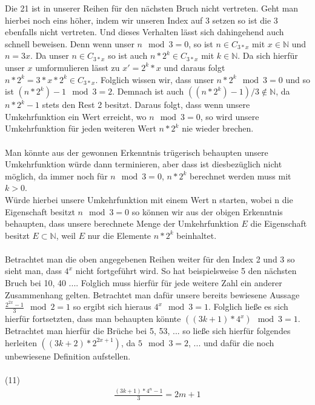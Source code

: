 \documentclass{article}
\begin{document}
Die 21 ist in unserer Reihen für den nächsten Bruch nicht vertreten. Geht man hierbei noch eins höher, indem wir unseren Index auf 3 setzen so ist die 3 ebenfalls nicht vertreten. Und dieses Verhalten lässt sich dahingehend auch schnell beweisen. Denn wenn unser $n \mod 3 = 0$, so ist $n \in C_{3 * x}$ mit $x \in \mathbb{N}$ und $n = 3x$. Da unser $n \in C_{3 * x}$ so ist auch $n * 2^k \in C_{3 * x}$ mit $k \in \mathbb{N}$. Da sich hierfür unser $x$ umformulieren lässt zu $x' = 2^k * x$ und daraus folgt $n * 2^k  = 3 * x * 2^k \in C_{3 * x}$. Folglich wissen wir, dass unser $n * 2^k \mod 3 = 0$ und so ist $(n * 2^k) - 1 \mod 3 = 2$. Demnach ist auch $((n * 2^k) - 1) / 3 \notin \mathbb{N}$, da $n * 2^k - 1$ stets den Rest 2 besitzt. Daraus folgt, dass wenn unsere Umkehrfunktion ein Wert erreicht, wo $n \mod 3 = 0$, so wird unsere Umkehrfunktion für jeden weiteren Wert $n * 2^k$ nie wieder brechen.\\\\
Man könnte aus der gewonnen Erkenntnis trügerisch behaupten unsere Umkehrfunktion würde dann terminieren, aber dass ist diesbezüglich nicht möglich, da immer noch für $n \mod 3 = 0$, $n * 2^k$ berechnet werden muss mit $k > 0$.\\
Würde hierbei unsere Umkehrfunktion mit einem Wert n starten, wobei n die Eigenschaft besitzt $n \mod 3 = 0$ so können wir aus der obigen Erkenntnis behaupten, dass unsere berechnete Menge der Umkehrfunktion $E$ die Eigenschaft besitzt $E \subset \mathbb{N}$, weil $E$ nur die Elemente $n * 2^k$ beinhaltet. \\\\
Betrachtet man die oben angegebenen Reihen weiter für den Index 2 und 3 so sieht man, dass $4^x$ nicht fortgeführt wird. So hat beispielsweise 5 den nächsten Bruch bei 10, 40 .... Folglich muss hierfür für jede weitere Zahl ein anderer Zusammenhang gelten. Betrachtet man dafür unsere bereits bewiesene Aussage $\frac{2^{2x}-1}{3} \mod 2 = 1$ so ergibt sich hieraus $4^{x} \mod 3 = 1$. Folglich ließe es sich hierfür fortsetzten, dass man behaupten könnte $((3k + 1) * 4^{x}) \mod 3 = 1$. Betrachtet man hierfür die Brüche bei 5, 53, ... so ließe sich hierfür folgendes herleiten $((3k + 2) * 2^{2x+1})$, da $5 \mod 3 = 2$, ... und dafür die noch unbewiesene Definition aufstellen.\\\\
(11)
\begin{gather*}
\frac{(3k+1)*4^n-1}{3} = 2m + 1 
\end{gather*} \\
\end{document}
